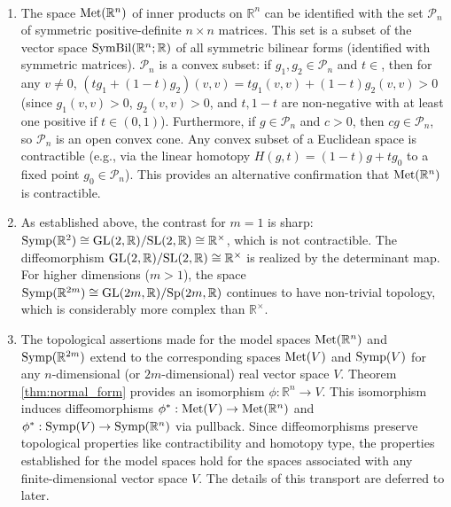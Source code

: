 \begin{remark} \label{rem:topology_spaces}
\,
\begin{enumerate}
    \item The space $\operatorname{Met}(\mathbb{R}^n)$ of inner products on $\mathbb{R}^n$ can be identified with the set $\mathcal{P}_n$ of symmetric positive-definite $n \times n$ matrices. This set is a subset of the vector space $\operatorname{SymBil}(\mathbb{R}^n; \mathbb{R})$ of all symmetric bilinear forms (identified with symmetric matrices). $\mathcal{P}_n$ is a convex subset: if $g_1, g_2 \in \mathcal{P}_n$ and $t \in $, then for any $v \neq 0$, $(t g_1 + (1-t) g_2)(v, v) = t g_1(v,v) + (1-t) g_2(v,v) > 0$ (since $g_1(v,v) > 0$, $g_2(v,v) > 0$, and $t, 1-t$ are non-negative with at least one positive if $t \in (0,1)$). Furthermore, if $g \in \mathcal{P}_n$ and $c > 0$, then $cg \in \mathcal{P}_n$, so $\mathcal{P}_n$ is an open convex cone. Any convex subset of a Euclidean space is contractible (e.g., via the linear homotopy $H(g, t) = (1-t)g + t g_0$ to a fixed point $g_0 \in \mathcal{P}_n$). This provides an alternative confirmation that $\operatorname{Met}(\mathbb{R}^n)$ is contractible.
    \item As established above, the contrast for $m=1$ is sharp: $\operatorname{Symp}(\mathbb{R}^2) \cong \mathrm{GL}(2, \mathbb{R}) / \mathrm{SL}(2, \mathbb{R}) \cong \mathbb{R}^\times$, which is not contractible. The diffeomorphism $\mathrm{GL}(2, \mathbb{R}) / \mathrm{SL}(2, \mathbb{R}) \cong \mathbb{R}^\times$ is realized by the determinant map. For higher dimensions ($m>1$), the space $\operatorname{Symp}(\mathbb{R}^{2m}) \cong \mathrm{GL}(2m, \mathbb{R}) / \mathrm{Sp}(2m, \mathbb{R})$ continues to have non-trivial topology, which is considerably more complex than $\mathbb{R}^\times$.
    \item The topological assertions made for the model spaces $\operatorname{Met}(\mathbb{R}^n)$ and $\operatorname{Symp}(\mathbb{R}^{2m})$ extend to the corresponding spaces $\operatorname{Met}(V)$ and $\operatorname{Symp}(V)$ for any $n$-dimensional (or $2m$-dimensional) real vector space $V$. Theorem \ref{thm:normal_form} provides an isomorphism $\phi: \mathbb{R}^n \to V$. This isomorphism induces diffeomorphisms $\phi^*: \operatorname{Met}(V) \to \operatorname{Met}(\mathbb{R}^n)$ and $\phi^*: \operatorname{Symp}(V) \to \operatorname{Symp}(\mathbb{R}^n)$ via pullback. Since diffeomorphisms preserve topological properties like contractibility and homotopy type, the properties established for the model spaces hold for the spaces associated with any finite-dimensional vector space $V$. The details of this transport are deferred to later.
\end{enumerate}
\end{remark}

